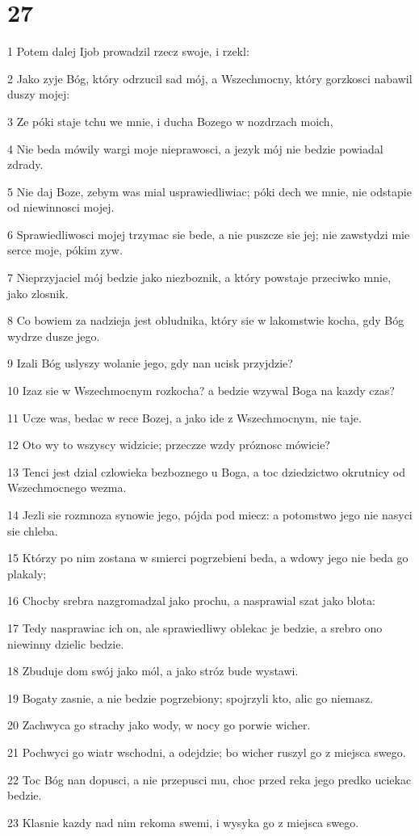 \chapter{27}

\par 1 Potem dalej Ijob prowadzil rzecz swoje, i rzekl:
\par 2 Jako zyje Bóg, który odrzucil sad mój, a Wszechmocny, który gorzkosci nabawil duszy mojej:
\par 3 Ze póki staje tchu we mnie, i ducha Bozego w nozdrzach moich,
\par 4 Nie beda mówily wargi moje nieprawosci, a jezyk mój nie bedzie powiadal zdrady.
\par 5 Nie daj Boze, zebym was mial usprawiedliwiac; póki dech we mnie, nie odstapie od niewinnosci mojej.
\par 6 Sprawiedliwosci mojej trzymac sie bede, a nie puszcze sie jej; nie zawstydzi mie serce moje, pókim zyw.
\par 7 Nieprzyjaciel mój bedzie jako niezboznik, a który powstaje przeciwko mnie, jako zlosnik.
\par 8 Co bowiem za nadzieja jest obludnika, który sie w lakomstwie kocha, gdy Bóg wydrze dusze jego.
\par 9 Izali Bóg uslyszy wolanie jego, gdy nan ucisk przyjdzie?
\par 10 Izaz sie w Wszechmocnym rozkocha? a bedzie wzywal Boga na kazdy czas?
\par 11 Ucze was, bedac w rece Bozej, a jako ide z Wszechmocnym, nie taje.
\par 12 Oto wy to wszyscy widzicie; przeczze wzdy próznosc mówicie?
\par 13 Tenci jest dzial czlowieka bezboznego u Boga, a toc dziedzictwo okrutnicy od Wszechmocnego wezma.
\par 14 Jezli sie rozmnoza synowie jego, pójda pod miecz: a potomstwo jego nie nasyci sie chleba.
\par 15 Którzy po nim zostana w smierci pogrzebieni beda, a wdowy jego nie beda go plakaly;
\par 16 Chocby srebra nazgromadzal jako prochu, a nasprawial szat jako blota:
\par 17 Tedy nasprawiac ich on, ale sprawiedliwy oblekac je bedzie, a srebro ono niewinny dzielic bedzie.
\par 18 Zbuduje dom swój jako mól, a jako stróz bude wystawi.
\par 19 Bogaty zasnie, a nie bedzie pogrzebiony; spojrzyli kto, alic go niemasz.
\par 20 Zachwyca go strachy jako wody, w nocy go porwie wicher.
\par 21 Pochwyci go wiatr wschodni, a odejdzie; bo wicher ruszyl go z miejsca swego.
\par 22 Toc Bóg nan dopusci, a nie przepusci mu, choc przed reka jego predko uciekac bedzie.
\par 23 Klasnie kazdy nad nim rekoma swemi, i wysyka go z miejsca swego.

